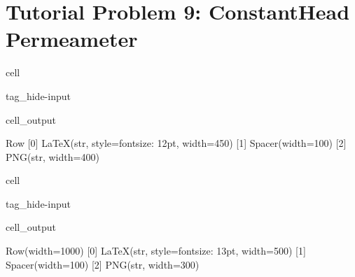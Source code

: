 \documentclass[letterpaper,10pt,english]{jupyterBook}
\begin{document}
\section{Tutorial Problem 9: Constant\sphinxhyphen{}Head Permeameter}
\label{\detokenize{content/tutorials/T3/tutorial_03:tutorial-problem-9-constant-head-permeameter}}
\begin{sphinxuseclass}{cell}
\begin{sphinxuseclass}{tag_hide-input}\begin{sphinxVerbatimOutput}

\begin{sphinxuseclass}{cell_output}
\begin{sphinxVerbatim}[commandchars=\\\{\}]
Row
    [0] LaTeX(str, style=\PYGZob{}\PYGZsq{}font\PYGZhy{}size\PYGZsq{}: \PYGZsq{}12pt\PYGZsq{}\PYGZcb{}, width=450)
    [1] Spacer(width=100)
    [2] PNG(str, width=400)
\end{sphinxVerbatim}

\end{sphinxuseclass}\end{sphinxVerbatimOutput}

\end{sphinxuseclass}
\end{sphinxuseclass}
\begin{sphinxuseclass}{cell}
\begin{sphinxuseclass}{tag_hide-input}\begin{sphinxVerbatimOutput}

\begin{sphinxuseclass}{cell_output}
\begin{sphinxVerbatim}[commandchars=\\\{\}]
Row(width=1000)
    [0] LaTeX(str, style=\PYGZob{}\PYGZsq{}font\PYGZhy{}size\PYGZsq{}: \PYGZsq{}13pt\PYGZsq{}\PYGZcb{}, width=500)
    [1] Spacer(width=100)
    [2] PNG(str, width=300)
\end{sphinxVerbatim}

\end{sphinxuseclass}\end{sphinxVerbatimOutput}

\end{sphinxuseclass}
\end{sphinxuseclass}
\end{document}
